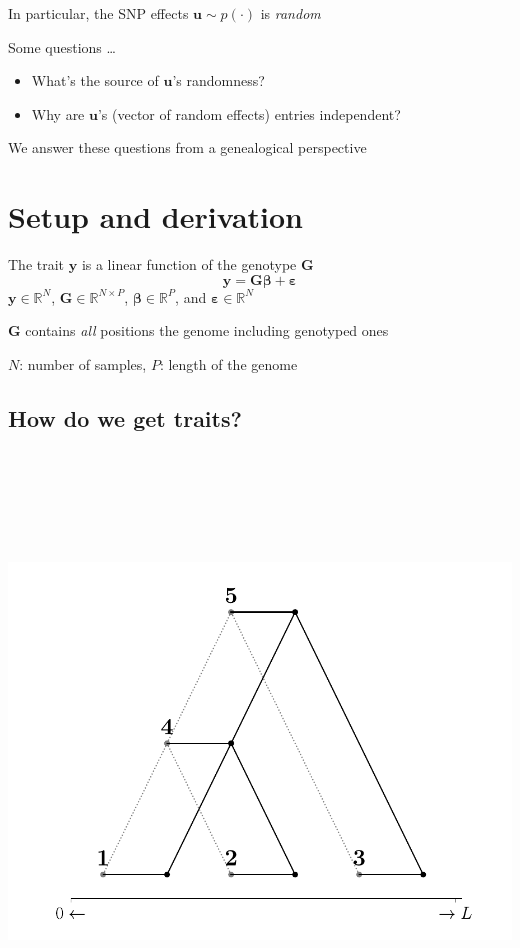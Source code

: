\documentclass[
  letterpaper,
  DIV=11,
  numbers=noendperiod]{scrartcl}
\providecommand{\tightlist}{%
  \setlength{\itemsep}{0pt}\setlength{\parskip}{0pt}}\usepackage{longtable,booktabs,array}
\begin{document}
In particular, the SNP effects \(\mathbf{u} \sim p(\cdot)\) is
\emph{random}

Some questions \ldots{}

\begin{itemize}
\tightlist
\item
  What's the source of \(\mathbf{u}\)'s randomness?
\item
  Why are \(\mathbf{u}\)'s (vector of random effects) entries
  independent?
\end{itemize}

We answer these questions from a genealogical perspective

\section{Setup and derivation}\label{setup-and-derivation}

The trait \(\mathbf{y}\) is a linear function of the genotype
\(\mathbf{G}\) \[
\mathbf{y} = \mathbf{G}\boldsymbol{\beta} + \boldsymbol{\varepsilon}
\] \(\mathbf{y} \in \mathbb{R}^N\),
\(\mathbf{G} \in \mathbb{R}^{N \times P}\),
\(\boldsymbol{\beta} \in \mathbb{R}^P\), and
\(\boldsymbol{\varepsilon} \in \mathbb{R}^N\)

\(\mathbf{G}\) contains \emph{all} positions the genome including
genotyped ones

\(N\): number of samples, \(P\): length of the genome

\subsection{How do we get traits?}\label{how-do-we-get-traits}

\includegraphics[width=\linewidth,height=6.25in,keepaspectratio]{slides_files/mediabag/imgs/tree-branch.pdf}
\end{document}
